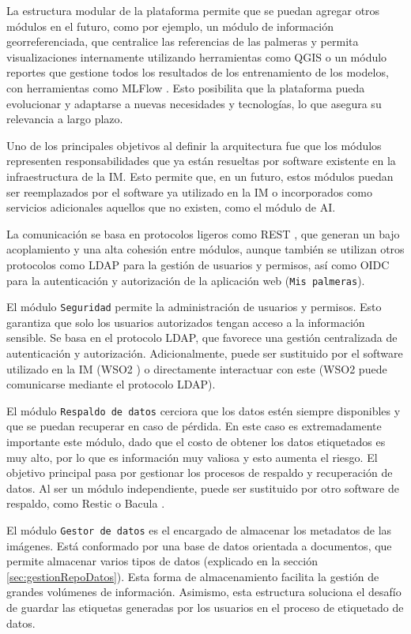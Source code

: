La estructura modular de la plataforma permite que se puedan agregar otros módulos en el futuro, como por ejemplo, un módulo de información georreferenciada, que centralice las referencias de las palmeras y permita visualizaciones internamente utilizando herramientas como QGIS \citep{wikipedia_qgis_2025} o un módulo reportes que gestione todos los resultados de los entrenamiento de los modelos, con herramientas como MLFlow \citep{zaharia_accelerating_2018}. Esto posibilita que la plataforma pueda evolucionar y adaptarse a nuevas necesidades y tecnologías, lo que asegura su relevancia a largo plazo.

Uno de los principales objetivos al definir la arquitectura fue que los módulos representen responsabilidades que ya están resueltas por software existente en la infraestructura de la IM. Esto permite que, en un futuro, estos módulos puedan ser reemplazados por el software ya utilizado en la IM o incorporados como servicios adicionales aquellos que no existen, como el módulo de AI.

La comunicación se basa en protocolos ligeros como REST \citep{wikipedia_protocolo_2024}, que generan un bajo acoplamiento y una alta cohesión entre módulos, aunque también se utilizan otros protocolos como LDAP para la gestión de usuarios y permisos, así como OIDC para la autenticación y autorización de la aplicación web (\texttt{Mis palmeras}).

El módulo \texttt{Seguridad} permite la administración de usuarios y permisos. Esto garantiza que solo los usuarios autorizados tengan acceso a la información sensible. Se basa en el protocolo LDAP, que favorece una gestión centralizada de autenticación y autorización. Adicionalmente, puede ser sustituido por el software utilizado en la IM (WSO2 \citep{wso2_deliver_nodate}) o directamente interactuar con este (WSO2 puede comunicarse mediante el protocolo LDAP).

El módulo \texttt{Respaldo de datos} cerciora que los datos estén siempre disponibles y que se puedan recuperar en caso de pérdida. En este caso es extremadamente importante este módulo, dado que el costo de obtener los datos etiquetados es muy alto, por lo que es información muy valiosa y esto aumenta el riesgo. El objetivo principal pasa por gestionar los procesos de respaldo y recuperación de datos. Al ser un módulo independiente, puede ser sustituido por otro software de respaldo, como Restic \citep{restic_restic_nodate} o Bacula \citep{bacula_documentation_nodate}.

El módulo \texttt{Gestor de datos} es el encargado de almacenar los metadatos de las imágenes. Está conformado por una base de datos orientada a documentos, que permite almacenar varios tipos de datos (explicado en la sección \ref{sec:gestionRepoDatos}). Esta forma de almacenamiento facilita la gestión de grandes volúmenes de información. Asimismo, esta estructura soluciona el desafío de guardar las etiquetas generadas por los usuarios en el proceso de etiquetado de datos.

